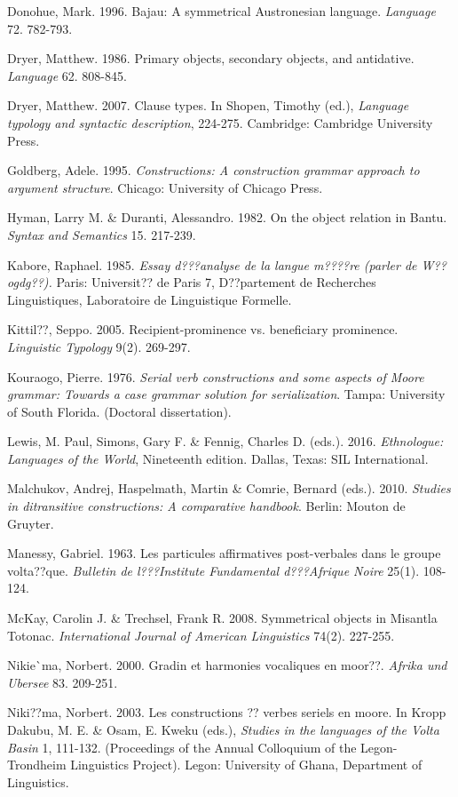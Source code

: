 \documentclass[output=paper]{langsci/langscibook}
\begin{document}
Donohue, Mark. 1996. Bajau: A symmetrical Austronesian language. \textit{Language} 72. 782-793.

Dryer, Matthew. 1986. Primary objects, secondary objects, and antidative. \textit{Language} 62. 808-845.

Dryer, Matthew. 2007. Clause types. In Shopen, Timothy (ed.), \textit{Language typology and syntactic description}, 224-275. Cambridge: Cambridge University Press. 

Goldberg, Adele. 1995. \textit{Constructions: A construction grammar approach to argument structure}. Chicago: University of Chicago Press. 

Hyman, Larry M. \& Duranti, Alessandro. 1982. On the object relation in Bantu. \textit{Syntax and Semantics} 15. 217-239. 

Kabore, Raphael. 1985. \textit{Essay d???analyse de la langue m????re (parler de W??ogdg??).} Paris: Universit?? de Paris 7, D??partement de Recherches Linguistiques, Laboratoire de Linguistique Formelle. 

Kittil??, Seppo. 2005. Recipient-prominence vs. beneficiary prominence. \textit{Linguistic Typology} 9(2). 269-297. 

Kouraogo, Pierre. 1976. \textit{Serial verb constructions and some aspects of Moore grammar: Towards a case grammar solution for serialization}. Tampa: University of South Florida. (Doctoral dissertation). 

Lewis, M. Paul, Simons, Gary F. \& Fennig, Charles D. (eds.). 2016. \textit{Ethnologue: Languages of the World}, Nineteenth edition. Dallas, Texas: SIL International.

Malchukov, Andrej, Haspelmath, Martin \& Comrie, Bernard (eds.). 2010. \textit{Studies in ditransitive constructions: A comparative handbook}. Berlin: Mouton de Gruyter.

Manessy, Gabriel. 1963. Les particules affirmatives post-verbales dans le groupe volta??que. \textit{Bulletin de l???Institute Fundamental d???Afrique Noire} 25(1). 108-124.

McKay, Carolin J. \& Trechsel, Frank R. 2008. Symmetrical objects in Misantla Totonac. \textit{International Journal of American Linguistics} 74(2). 227-255.

Nikie\`{ }ma, Norbert. 2000. Gradin et harmonies vocaliques en moor??. \textit{Afrika und Ubersee} 83. 209-251. 

Niki??ma, Norbert. 2003. Les constructions ?? verbes seriels en moore. In Kropp Dakubu, M. E. \& Osam, E. Kweku (eds.), \textit{Studies in the languages of the Volta Basin }1, 111-132. (Proceedings of the Annual Colloquium of the Legon-Trondheim Linguistics Project). Legon: University of Ghana, Department of Linguistics.
\end{document}
